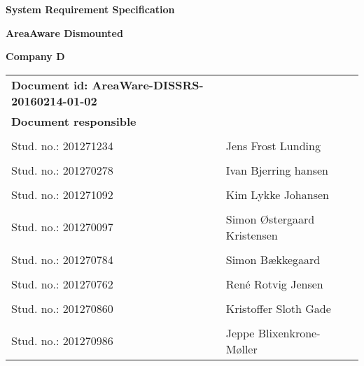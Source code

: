 
\centerline{\Huge\bfseries\color{ThemeColor} System Requirement Specification } 

\vspace{1em}
\centerline{\Large\bfseries\color{BlackColor} AreaAware Dismounted} 

\vspace{5em}
\centerline{\large\bfseries\color{BlackColor}Company D} 




\begin{center}
	\begin{tabular}{ l l p{6cm} }
		\textbf{Document id: AreaWare-DISSRS-20160214-01-02}& & \\
		\textbf{Document responsible}& & \\
		& & \\
		Stud. no.:  201271234 & Jens Frost Lunding & \\\hline
		& & \\
		Stud. no.:  201270278 & Ivan Bjerring hansen & \\\hline
		& & \\
		Stud. no.:  201271092 & Kim Lykke Johansen & \\\hline
		& & \\	
		Stud. no.:  201270097 & Simon Østergaard Kristensen & \\\hline
		& & \\
		Stud. no.:  201270784 & Simon Bækkegaard & \\\hline
		& & \\
		Stud. no.: 	201270762 & René Rotvig Jensen & \\\hline
		& & \\
		Stud. no.: 	201270860 & Kristoffer Sloth Gade & \\\hline
		& & \\
		Stud. no.: 	201270986 & Jeppe Blixenkrone-Møller & \\\hline
	\end{tabular}     	
\end{center}
\thispagestyle{empty} %
\restoregeometry



		